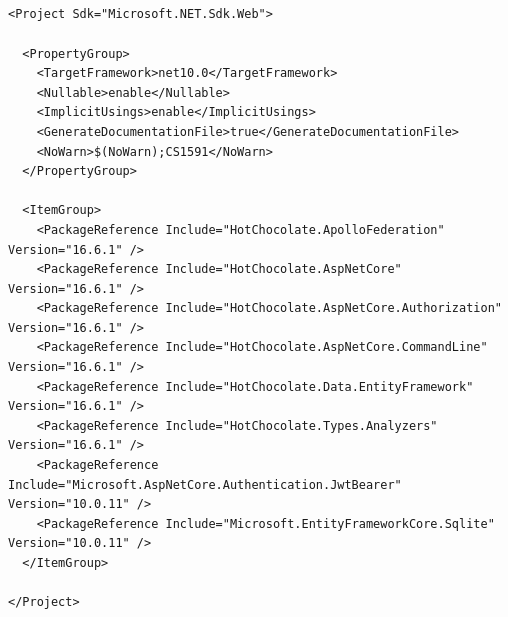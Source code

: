 \subsection*{}
\begin{verbatim}
<Project Sdk="Microsoft.NET.Sdk.Web">

  <PropertyGroup>
    <TargetFramework>net10.0</TargetFramework>
    <Nullable>enable</Nullable>
    <ImplicitUsings>enable</ImplicitUsings>
    <GenerateDocumentationFile>true</GenerateDocumentationFile>
    <NoWarn>$(NoWarn);CS1591</NoWarn>
  </PropertyGroup>

  <ItemGroup>
    <PackageReference Include="HotChocolate.ApolloFederation" Version="16.6.1" />
    <PackageReference Include="HotChocolate.AspNetCore" Version="16.6.1" />
    <PackageReference Include="HotChocolate.AspNetCore.Authorization" Version="16.6.1" />
    <PackageReference Include="HotChocolate.AspNetCore.CommandLine" Version="16.6.1" />
    <PackageReference Include="HotChocolate.Data.EntityFramework" Version="16.6.1" />
    <PackageReference Include="HotChocolate.Types.Analyzers" Version="16.6.1" />
    <PackageReference Include="Microsoft.AspNetCore.Authentication.JwtBearer" Version="10.0.11" />
    <PackageReference Include="Microsoft.EntityFrameworkCore.Sqlite" Version="10.0.11" />
  </ItemGroup>

</Project>
\end{verbatim}

